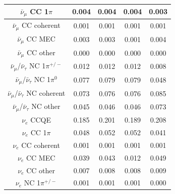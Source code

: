 \begin{table}
\begin{tabular} { | c ||c | c | c | c |  | }
$\bar{\nu}_\mu$ CC 1$\pi$                         & 0.004               & 0.004               & 0.004               & 0.003                \\ \hline 
$\bar{\nu}_\mu$ CC coherent                       & 0.001               & 0.001               & 0.001               & 0.001                \\ \hline 
$\bar{\nu}_\mu$ CC MEC                            & 0.003               & 0.003               & 0.001               & 0.004                \\ \hline 
$\bar{\nu}_\mu$ CC other                          & 0.000               & 0.000               & 0.000               & 0.000                \\ \hline 
$\bar{\nu}_\mu$/$\bar{\nu}_\tau$ NC 1$\pi^{+/-}$  & 0.012               & 0.012               & 0.012               & 0.008                \\ \hline 
$\bar{\nu}_\mu$/$\bar{\nu}_\tau$ NC 1$\pi^0$      & 0.077               & 0.079               & 0.079               & 0.048                \\ \hline 
$\bar{\nu}_\mu$/$\bar{\nu}_\tau$ NC coherent      & 0.073               & 0.076               & 0.076               & 0.085                \\ \hline 
$\bar{\nu}_\mu$/$\bar{\nu}_\tau$ NC other         & 0.045               & 0.046               & 0.046               & 0.073                \\ \hline 
$\nu_e$ CCQE                                      & 0.185               & 0.201               & 0.189               & 0.208                \\ \hline 
$\nu_e$ CC 1$\pi$                                 & 0.048               & 0.052               & 0.052               & 0.041                \\ \hline 
$\nu_e$ CC coherent                               & 0.001               & 0.001               & 0.001               & 0.001                \\ \hline 
$\nu_e$ CC MEC                                    & 0.039               & 0.043               & 0.012               & 0.049                \\ \hline 
$\nu_e$ CC other                                  & 0.007               & 0.008               & 0.008               & 0.009                \\ \hline 
$\nu_e$ NC 1$\pi^{+/-}$                           & 0.001               & 0.001               & 0.001               & 0.000                \\ \hline 

\end{tabular}
\end{table}
